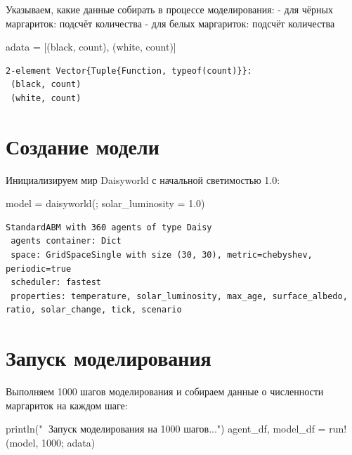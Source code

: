 \documentclass[
  12pt,
  a4paper,
  DIV=11,
  numbers=noendperiod]{scrreprt}
\newenvironment{Shaded}{\begin{snugshade}}{\end{snugshade}}
\newcommand{\FloatTok}[1]{\textcolor[rgb]{0.68,0.00,0.00}{#1}}
\newcommand{\FunctionTok}[1]{\textcolor[rgb]{0.28,0.35,0.67}{#1}}
\newcommand{\NormalTok}[1]{\textcolor[rgb]{0.00,0.23,0.31}{#1}}
\newcommand{\OperatorTok}[1]{\textcolor[rgb]{0.37,0.37,0.37}{#1}}
\newcommand{\StringTok}[1]{\textcolor[rgb]{0.13,0.47,0.30}{#1}}
\begin{document}
Указываем, какие данные собирать в процессе моделирования: - для чёрных
маргариток: подсчёт количества - для белых маргариток: подсчёт
количества

\begin{Shaded}
\begin{Highlighting}[]
\NormalTok{adata }\OperatorTok{=}\NormalTok{ [(black, count), (white, count)]}
\end{Highlighting}
\end{Shaded}

\begin{verbatim}
2-element Vector{Tuple{Function, typeof(count)}}:
 (black, count)
 (white, count)
\end{verbatim}

\section{Создание
модели}\label{ux441ux43eux437ux434ux430ux43dux438ux435-ux43cux43eux434ux435ux43bux438-1}

Инициализируем мир Daisyworld с начальной светимостью 1.0:

\begin{Shaded}
\begin{Highlighting}[]
\NormalTok{model }\OperatorTok{=} \FunctionTok{daisyworld}\NormalTok{(; solar\_luminosity }\OperatorTok{=} \FloatTok{1.0}\NormalTok{)}
\end{Highlighting}
\end{Shaded}

\begin{verbatim}
StandardABM with 360 agents of type Daisy
 agents container: Dict
 space: GridSpaceSingle with size (30, 30), metric=chebyshev, periodic=true
 scheduler: fastest
 properties: temperature, solar_luminosity, max_age, surface_albedo, ratio, solar_change, tick, scenario
\end{verbatim}

\section{Запуск
моделирования}\label{ux437ux430ux43fux443ux441ux43a-ux43cux43eux434ux435ux43bux438ux440ux43eux432ux430ux43dux438ux44f}

Выполняем 1000 шагов моделирования и собираем данные о численности
маргариток на каждом шаге:

\begin{Shaded}
\begin{Highlighting}[]
\FunctionTok{println}\NormalTok{(}\StringTok{"🔄 Запуск моделирования на 1000 шагов..."}\NormalTok{)}
\NormalTok{agent\_df, model\_df }\OperatorTok{=} \FunctionTok{run!}\NormalTok{(model, }\FloatTok{1000}\NormalTok{; adata)}
\end{Highlighting}
\end{Shaded}
\end{document}
